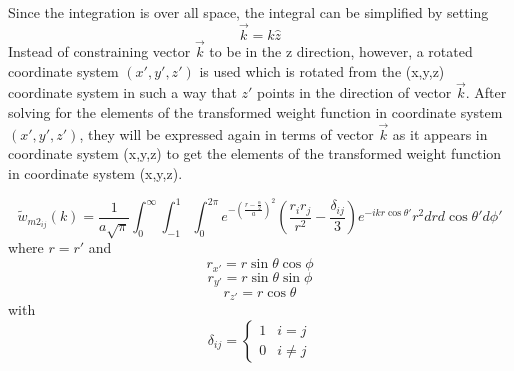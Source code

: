 \documentclass[letterpaper,twocolumn,amsmath,amssymb,prb]{revtex4-1}
\begin{document}
\begin{widetext}
Since the integration is over all space, the integral can be simplified by setting 
\begin{equation}{\vec{k}=k\hat{z}}\end{equation}
Instead of constraining vector $\vec{k}$ to be in the z direction, however, a rotated coordinate system $(x',y',z')$ is used which is rotated from the (x,y,z) coordinate system in such a way that $z'$ points in the direction of vector $\vec{k}$. After solving for the elements of the transformed weight function in coordinate system $(x',y',z')$, they will be expressed again in terms of vector $\vec{k}$ as it appears in coordinate system (x,y,z) to get the elements of the transformed weight function in coordinate system (x,y,z).

\begin{equation}{\widetilde{w}_{m2_{ij}}(k)=\frac{1}{a\sqrt{\pi}}\int_{0}^{\infty}\int_{-1}^{1}\int_{0}^{2\pi}e^{-\left(\frac{r-\frac{\alpha}{2}}{a}\right)^2}\left(\frac{r_ir_j}{r^2}-\frac{\delta_{ij}}{3}\right)e^{-ikr\cos\theta'}r^2d{r}d{\cos\theta'}d{\phi'}}\end{equation}
where $r=r'$ and
\begin{displaymath}{r_{x'}=r\sin\theta\cos\phi}\end{displaymath}
\begin{displaymath}{r_{y'}=r\sin\theta\sin\phi}\end{displaymath}
\begin{displaymath}{r_{z'}=r\cos\theta}\end{displaymath} 
with
\begin{displaymath}{\delta_{ij}=\left\{ \begin{array}{rc} 1 & i = j \\ 0  & i\neq j \end{array}\right.}\end{displaymath}
\[{}\]


\end{widetext}
\end{document}

